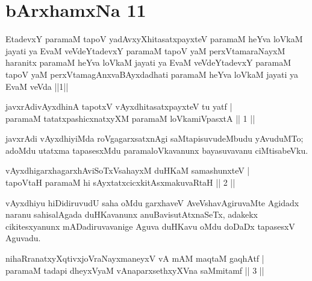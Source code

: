 \section*{bArxhamxNa 11}

\begin{shl}
EtadevxY paramaM tapoV yadAvxyXhitasatxpayxteV paramaM heYva loVkaM jayati ya EvaM veVdeYtadevxY paramaM tapoV yaM perxVtamaraNayxM haranitx paramaM heYva loVkaM jayati ya EvaM veVdeYtadevxY paramaM tapoV yaM perxVtamagAnxvaBAyxdadhati paramaM heYva loVkaM jayati ya EvaM veVda ||1||
\end{shl}



\begin{shl}
javxrAdivAyxdhinA tapotxV vAyxdhitasatxpayxteV tu yatf | \\
paramaM tatatxpashicxnatxyXM paramaM loVkamiVpasxtA \hfill ||  1 ||
\end{shl}

\begin{artha}
javxrAdi vAyxdhiyiMda roVgagarxsatxnAgi saMtapisuvudeMbudu yAvuduMTo; adoMdu utatxma tapasesxMdu paramaloVkavanunx bayasuvavanu ciMtisabeVku.
\end{artha}


\begin{shl}
vAyxdhigarxhagarxhAviSoTxV\s sahayxM duHKaM samashunxteV | \\
tapoV\s taH paramaM hi sAyxtatxcicxkitAsxmakuvaRtaH \hfill ||  2 || 
\end{shl}

\begin{artha}
vAyxdhiyu hiDidiruvudU saha oMdu garxhaveV AveVshavAgiruvaMte Agidadx naranu sahisalAgada duHKavanunx anuBavisutAtxnaSeTx, adakekx cikitesxyanunx mADadiruvavanige Aguva duHKavu oMdu doDaDx tapasesxV Aguvadu.
\end{artha}


\begin{shl}
nihaRranatxyXqtivxjoV\s raNayxmaneyxV vA mAM maqtaM gaqhAtf | \\
paramaM tadapi dheyxVyaM vAnaparxsethxyXVna saMmitamf \hfill ||  3 || 
\end{shl}

